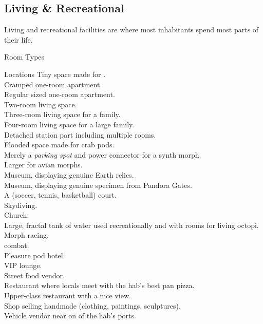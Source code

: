 \documentclass[a4]{article}
\begin{document}
\subsection{Living \& Recreational}

Living and recreational facilities are where most inhabitants spend most parts of their life.

Room Types

\begin{tableone}{Locations}
Tiny space made for .\\
Cramped one-room apartment.\\
Regular sized one-room apartment.\\
Two-room living space.\\
Three-room living space for a family.\\
Four-room living space for a large family.\\
Detached station part including multiple rooms.\\
Flooded space made for crab pods.\\
Merely a \textit{parking spot} and power connector for a synth morph.\\
Larger  for avian morphs.\\
Museum, displaying genuine Earth relics.\\
Museum, displaying genuine specimen from Pandora Gates.\\
A (soccer, tennis, basketball) court.\\
Skydiving.\\
Church.\\
Large, fractal tank of water used recreationally and with rooms for living octopi.\\
Morph racing.\\
 combat.\\
Pleasure pod hotel.\\
VIP lounge.\\
Street food vendor.\\
Restaurant where locals meet with the hab's best pan pizza.\\
Upper-class restaurant with a nice view.\\
Shop selling handmade (clothing, paintings, sculptures).\\
Vehicle vendor near on of the hab's ports.\\
\end{tableone}
\end{document}
